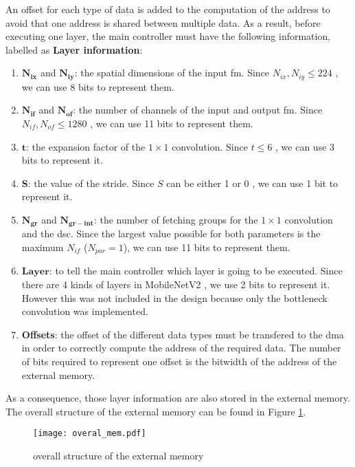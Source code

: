 An offset for each type of data is added to the computation of the address to avoid that one address is shared between multiple data. As a result, before executing one layer, the main controller must have the following information, labelled as \textbf{Layer information}:
%
\begin{enumerate}
    \item $\boldsymbol{N_{ix}}$ and $\boldsymbol{N_{iy}}$: the spatial dimensions of the input \acrshort{fm}. Since $N_{ix}, N_{iy} \leq 224$ \cite{sandler_mobilenetv2_2018}, we can use 8 bits to represent them.
    \item $\boldsymbol{N_{if}}$ and $\boldsymbol{N_{of}}$: the number of channels of the input  and output \acrshort{fm}. Since $N_{if}, N_{of} \leq 1280$ \cite{sandler_mobilenetv2_2018}, we can use 11 bits to represent them.
    \item $\boldsymbol{t}$: the expansion factor of the $1 \times 1$ convolution. Since $t \leq 6$ \cite{sandler_mobilenetv2_2018}, we can use 3 bits to represent it.
    \item $\boldsymbol{S}$: the value of the stride. Since $S$ can be either 1 or 0 \cite{sandler_mobilenetv2_2018}, we can use 1 bit to represent it.
    \item $\boldsymbol{N_{gr}}$ and $\boldsymbol{N_{gr-int}}$: the number of fetching groups for the $1 \times 1$ convolution and the \acrshort{dsc}. Since the largest value possible for both parameters is the maximum $N_{if}$ ($N_{par} = 1$), we can use 11 bits to represent them.
    \item $\boldsymbol{Layer}$: to tell the main controller which layer is going to be executed. Since there are 4 kinds of layers in MobileNetV2 \cite{sandler_mobilenetv2_2018}, we use 2 bits to represent it. However this was not included in the design because only the bottleneck convolution was implemented.
    \item \textbf{Offsets}: the offset of the different data types must be transfered to the \acrshort{dma} in order to correctly compute the address of the required data. The number of bits required to represent one offset is the bitwidth of the address of the external memory.
\end{enumerate}
%
As a consequence, those layer information are also stored in the external memory. The overall structure of the external memory can be found in Figure \ref{fig:overal_mem}.
%
\begin{figure}[H]
    \centering
    \texttt{[image: overal\_mem.pdf]}
    \caption{overall structure of the external memory}
    \label{fig:overal_mem}
\end{figure}
